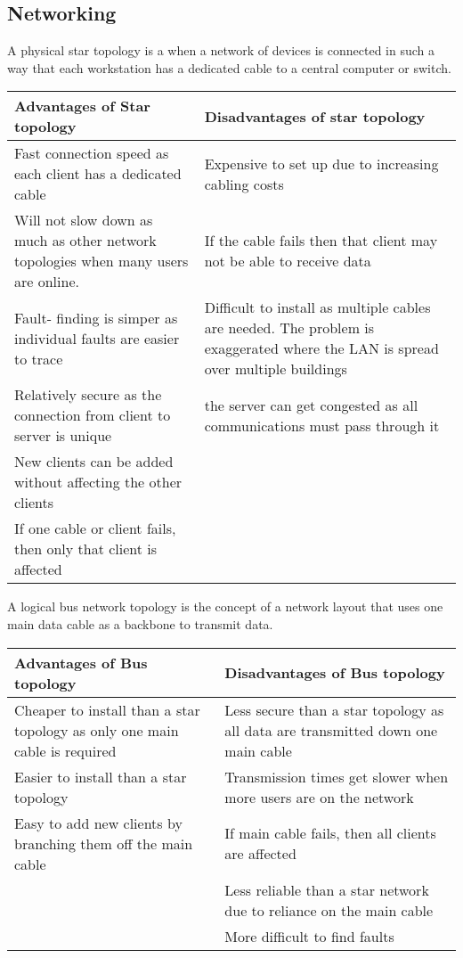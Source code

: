 \subsection{Networking}
  \noindent
  A physical star topology is a when a network of devices is connected in such a way that each workstation has a dedicated cable to a central computer or switch.
  \begin{table}[H]
    \centering
    \begin{tabular}{| L{7cm} | L{7cm} |} \hline
      \textbf{Advantages of Star topology} & \textbf{Disadvantages of star topology} \\ \hline
      Fast connection speed as each client has a dedicated cable & Expensive to set up due to increasing cabling costs \\ \hline
      Will not slow down as much as other network topologies when many users are online. & If the cable fails then that client may not be able to receive data \\ \hline
      Fault- finding is simper as individual faults are easier to trace & Difficult to install as multiple cables are needed. The problem is exaggerated where the LAN is spread over multiple buildings \\ \hline
      Relatively secure as the connection from client to server is unique & the server can get congested as all communications must pass through it \\ \hline
      New clients can be added without affecting the other clients & \\ 
      If one cable or client fails, then only that client is affected &  \\ 
    \end{tabular}
  \end{table} \noindent
  A logical bus network topology is the concept of a network layout that uses one main data cable as a backbone to transmit data.
  \begin{table}[H]
    \centering
    \begin{tabular}{| L{7cm} | L{7cm} |} \hline
      \textbf{Advantages of Bus topology} & \textbf{Disadvantages of Bus topology} \\ \hline
      Cheaper to install than a star topology as only one main cable is required & Less secure than a star topology as all data are transmitted down one main cable \\ \hline
      Easier to install than a star topology & Transmission times get slower when more users are on the network \\ \hline
      Easy to add new clients by branching them off the main cable & If main cable fails, then all clients are affected \\ \hline
       & Less reliable than a star network due to reliance on the main cable \\ 
       & More difficult to find faults \\ 
    \end{tabular}
  \end{table} \noindent
